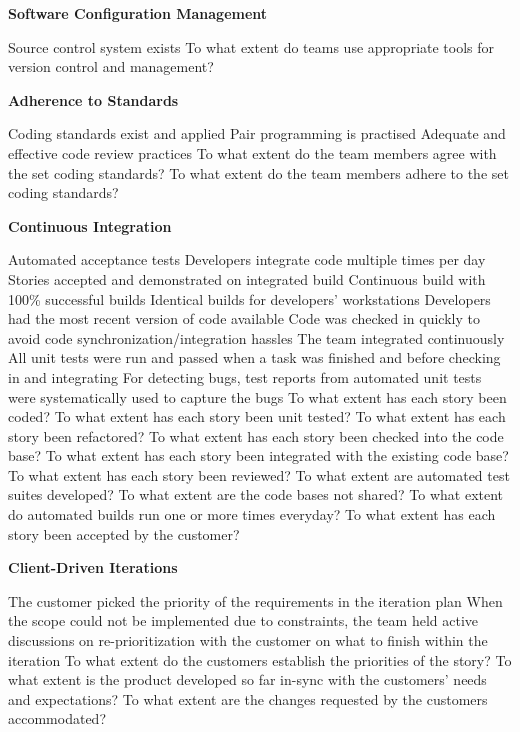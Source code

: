 \textbf{Software Configuration Management}
\begin{itemize}
	\taa Source control system exists
	\ops To what extent do teams use appropriate tools for version control and management?
\end{itemize}

\textbf{Adherence to Standards} %
\begin{itemize}
	\taa Coding standards exist and applied%
	\taa Pair programming is practised %
	\taa Adequate and effective code review practices%
	\ops To what extent do the team members agree with the set coding standards? 
	\ops To what extent do the team members adhere to the set coding standards?
\end{itemize}

\textbf{Continuous Integration}
\begin{itemize}
	\taa Automated acceptance tests
	\taa Developers integrate code multiple times per day%
	\taa Stories accepted and demonstrated on integrated build%
	\taa Continuous build with 100\% successful builds%
	\taa Identical builds for developers' workstations %
	\pam Developers had the most recent version of code available%
	\pam Code was checked in quickly to avoid code synchronization/integration hassles%
	\pam The team integrated continuously%
	\pam All unit tests were run and passed when a task was finished and before checking in and integrating%
	\pam For detecting bugs, test reports from automated unit tests were systematically used to capture the bugs%
	\ops To what extent has each story been coded? 
	\ops To what extent has each story been unit tested? 
	\ops To what extent has each story been refactored? 
	\ops To what extent has each story been checked into the code base? 
	\ops To what extent has each story been integrated with the existing code base? 
	\ops To what extent has each story been reviewed?
	\ops To what extent are automated test suites developed? 
	\ops To what extent are the code bases not shared? 
	\ops To what extent do automated builds run one or more times everyday?
	\ops To what extent has each story been accepted by the customer? %
\end{itemize}

\textbf{Client-Driven Iterations}
\begin{itemize}
	\pam The customer picked the priority of the requirements in the iteration plan
	\pam When the scope could not be implemented due to constraints, the team held active discussions on re-prioritization with the customer on what to finish within the iteration %
	\ops To what extent do the customers establish the priorities of the story?
	\ops To what extent is the product developed so far in-sync with the customers' needs and expectations?
	\ops To what extent are the changes requested by the customers accommodated?
\end{itemize}

